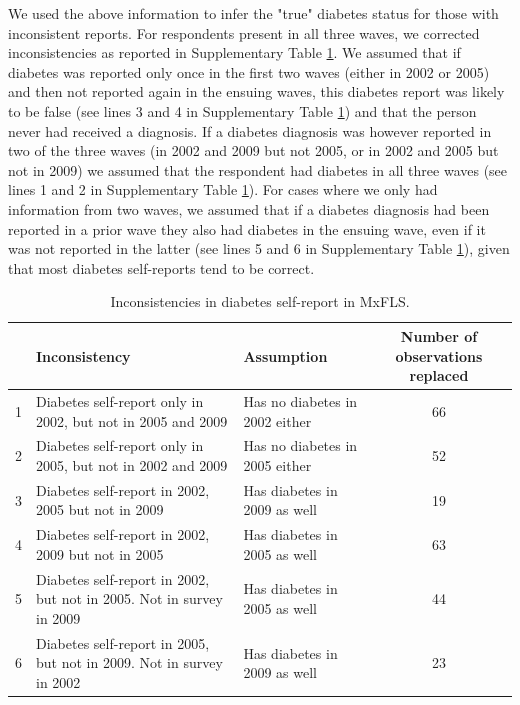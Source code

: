 \documentclass[12pt,english]{article}
\providecommand{\tabularnewline}{\\}
\begin{document}
We used the above information to infer the "true" diabetes status for those with inconsistent reports. For respondents present in all three waves, we corrected inconsistencies as reported in Supplementary Table \ref{tab:Inconsistencies}. We assumed that if diabetes was reported only once in the first two waves (either in 2002 or 2005) and then not reported again in the ensuing waves, this diabetes report was likely to be false (see lines 3 and 4 in Supplementary Table \ref{tab:Inconsistencies}) and that the person never had received a diagnosis. If a diabetes diagnosis was however reported in two of the three waves (in 2002 and 2009 but not 2005, or in 2002 and 2005 but not in 2009) we assumed that the respondent had diabetes in all three waves (see lines 1 and 2 in Supplementary Table \ref{tab:Inconsistencies}). For cases where we only had information from two waves, we assumed that if a diabetes diagnosis had been reported in a prior wave they also had diabetes in the ensuing wave, even if it was not reported in the latter (see lines 5 and 6 in Supplementary Table \ref{tab:Inconsistencies}), given that most diabetes self-reports tend to be correct.

\begin{table}[!ht]
	\caption{\label{tab:Inconsistencies}Inconsistencies in diabetes self-report in MxFLS.}
	\begin{center}
		\begin{adjustbox}{max width=\linewidth} 
			\begin{tabular}{lllc}
				\hline 
				&Inconsistency  & Assumption  & Number of observations replaced\tabularnewline
				\hline 
				1 &Diabetes self-report only in 2002, but not in 2005 and 2009  & Has no diabetes in 2002 either  & 66\tabularnewline
				2 &Diabetes self-report only in 2005, but not in 2002 and 2009  & Has no diabetes in 2005 either  & 52\tabularnewline
				3 &Diabetes self-report in 2002, 2005 but not in 2009  & Has diabetes in 2009 as well  & 19\tabularnewline
				4 &Diabetes self-report in 2002, 2009 but not in 2005  & Has diabetes in 2005 as well  & 63\tabularnewline
				5 &Diabetes self-report in 2002, but not in 2005. Not in survey in 2009  & Has diabetes in 2005 as well  & 44\tabularnewline
				6 &Diabetes self-report in 2005, but not in 2009. Not in survey in 2002  & Has diabetes in 2009 as well  & 23\tabularnewline
				\hline 
			\end{tabular}
		\end{adjustbox}
	\end{center}
\end{table}
\end{document}
